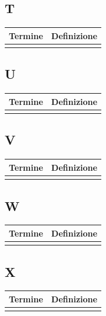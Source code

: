 \documentclass[10pt]{article}
\begin{document}
\subsection{T} %
\begin{tabularx}{\textwidth}{|>{\centering\arraybackslash}l|X|}
\hline
\rowcolor[gray]{0.8}
\textbf{Termine} & \textbf{Definizione}\\
\hline
 & \\
\hline
\end{tabularx}

\subsection{U} %
\begin{tabularx}{\textwidth}{|>{\centering\arraybackslash}l|X|}
\hline
\rowcolor[gray]{0.8}
\textbf{Termine} & \textbf{Definizione}\\
\hline
 & \\
\hline
\end{tabularx}

\subsection{V} %
\begin{tabularx}{\textwidth}{|>{\centering\arraybackslash}l|X|}
\hline
\rowcolor[gray]{0.8}
\textbf{Termine} & \textbf{Definizione}\\
\hline
 & \\
\hline
\end{tabularx}

\subsection{W} %
\begin{tabularx}{\textwidth}{|>{\centering\arraybackslash}l|X|}
\hline
\rowcolor[gray]{0.8}
\textbf{Termine} & \textbf{Definizione}\\
\hline
 & \\
\hline
\end{tabularx}

\subsection{X} %
\begin{tabularx}{\textwidth}{|>{\centering\arraybackslash}l|X|}
\hline
\rowcolor[gray]{0.8}
\textbf{Termine} & \textbf{Definizione}\\
\hline
 & \\
\hline
\end{tabularx}
\end{document}
